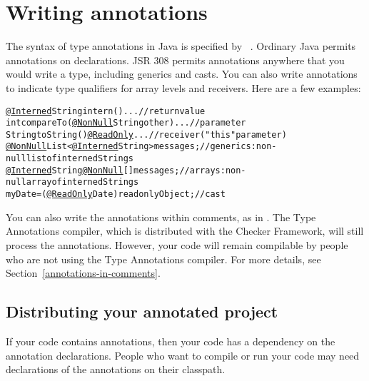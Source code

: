 

\section{Writing annotations\label{writing-annotations}}

The syntax of type annotations in Java is specified by
~\cite{jsr308}.  Ordinary
Java permits annotations on declarations.  JSR 308 permits annotations
anywhere that you would write a type, including generics and casts.  You
can also write annotations to indicate type qualifiers for array levels and
receivers.  Here are a few examples:

\begin{alltt}
  \underline{@Interned} String intern() \ttlcb{} ... \ttrcb{}             // return value
  int compareTo(\underline{@NonNull} String other) \ttlcb{} ... \ttrcb{}  // parameter
  String toString() \underline{@ReadOnly} \ttlcb{} ... \ttrcb{}           // receiver ("this" parameter)
  \underline{@NonNull} List<\underline{@Interned} String> messages;     // generics:  non-null list of interned Strings
  \underline{@Interned} String \underline{@NonNull} [] messages;        // arrays:  non-null array of interned Strings
  myDate = (\underline{@ReadOnly} Date) readonlyObject;     // cast
\end{alltt}

You can also write the annotations within comments, as in
.  The Type Annotations compiler, which is
distributed with the Checker Framework, will still process
the annotations.
However, your code will remain compilable by people who are not using the
Type Annotations compiler.  For more details, see
Section~\ref{annotations-in-comments}.



\subsection{Distributing your annotated project\label{distributing}}

If your code contains annotations, then your code has a dependency on the
annotation declarations.  People who want to compile or run your code may
need declarations of the annotations on their classpath.

